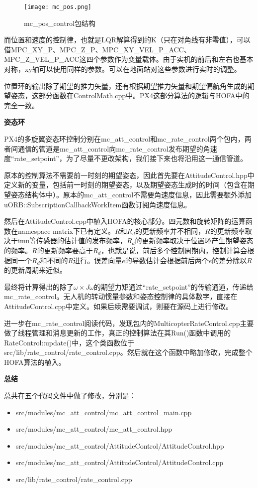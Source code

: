 \begin{figure}[!h]
  \centering
  \texttt{[image: mc\_pos.png]}
  \caption{mc\_pos\_control包结构}
  \label{mc_pos}
\end{figure}

而位置和速度的控制律，也就是LQR解算得到的K（只在对角线有非零值），可以借MPC\_XY\_P、MPC\_Z\_P、MPC\_XY\_VEL\_P\_ACC、MPC\_Z\_VEL\_P\_ACC这四个参数作为变量载体。由于实机的前后和左右也基本对称，xy轴可以使用同样的参数。可以在地面站对这些参数进行实时的调整。

位置环的输出除了期望的推力矢量，还有根据期望推力矢量和期望偏航角生成的期望姿态，这部分函数在ControlMath.cpp中。PX4这部分算法的逻辑与HOFA中的完全一致。

\textbf{姿态环}

PX4的多旋翼姿态环控制分别在mc\_att\_control和mc\_rate\_control两个包内，两者间通信的管道是mc\_att\_control向mc\_rate\_control发布期望的角速度“rate\_setpoint”，为了尽量不更改架构，我们接下来也将沿用这一通信管道。

原本的控制算法不需要前一时刻的期望姿态，因此首先要在AttitudeControl.hpp中定义新的变量，包括前一时刻的期望姿态，以及期望姿态生成时的时间（包含在期望姿态结构体中）。原本的mc\_att\_control不需要角速度信息，因此需要额外添加uORB::SubscriptionCallbackWorkItem函数订阅角速度信息。

然后在AttitudeControl.cpp中植入HOFA的核心部分。四元数和旋转矩阵的运算函数在namespace matrix下已有定义。$R$和$R_d$的更新频率并不相同，$R$的更新频率取决于imu等传感器的估计值的发布频率，$R_d$的更新频率取决于位置环产生期望姿态的频率。$R$的更新频率要高于$R_d$，也就是说，前后多个控制周期内，控制计算会根据同一个$R_d$和不同的$R$进行。误差向量$e$的导数估计会根据前后两个$e$的差分除以$R$的更新周期来近似。

最终将计算得出的除了$\omega \times J\omega$的期望力矩通过“rate\_setpoint”的传输通道，传递给mc\_rate\_control。无人机的转动惯量参数和姿态控制律的具体数字，直接在AttitudeControl.cpp中定义。如果后续需要调试，则要在源码上进行修改。

进一步在mc\_rate\_control阅读代码，发现包内的MulticopterRateControl.cpp主要做了线程管理和消息更新的工作，真正的控制算法在其Run()函数中调用的RateControl::update()中，这个类函数位于src/lib/rate\_control/rate\_control.cpp。然后就在这个函数中略加修改，完成整个HOFA算法的植入。

\textbf{总结}

总共在五个代码文件中做了修改，分别是：
\begin{itemize}
  \item src/modules/mc\_att\_control/mc\_att\_control\_main.cpp
  \item src/modules/mc\_att\_control/mc\_att\_control.hpp
  \item src/modules/mc\_att\_control/AttitudeControl/AttitudeControl.hpp
  \item src/modules/mc\_att\_control/AttitudeControl/AttitudeControl.cpp
  \item src/lib/rate\_control/rate\_control.cpp
\end{itemize}

